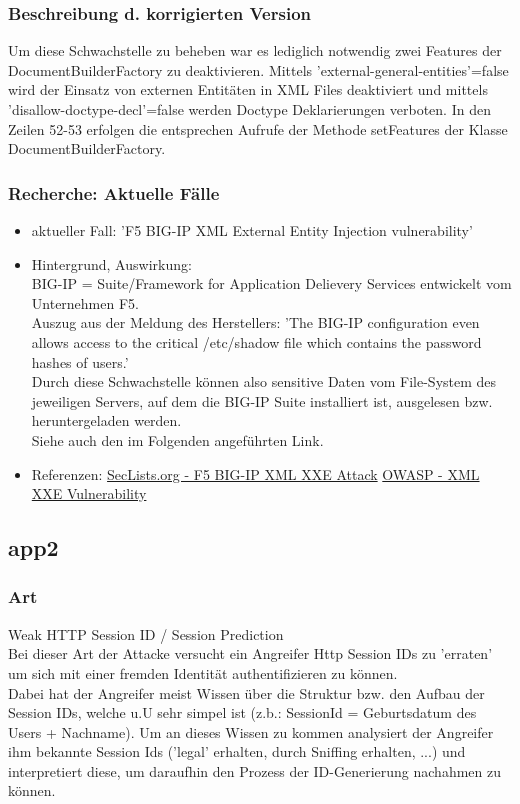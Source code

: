 \documentclass[12pt,a4paper,titlepage,oneside]{scrartcl}
\begin{document}
\subsubsection{Beschreibung d. korrigierten Version}
\noindent
Um diese Schwachstelle zu beheben war es lediglich notwendig zwei Features der DocumentBuilderFactory zu deaktivieren. Mittels 'external-general-entities'=false wird der Einsatz von externen Entitäten in XML Files deaktiviert und mittels 'disallow-doctype-decl'=false werden Doctype Deklarierungen verboten. 
In den Zeilen 52-53 erfolgen die entsprechen Aufrufe der Methode setFeatures der Klasse DocumentBuilderFactory.

\subsubsection{Recherche: Aktuelle Fälle}
\noindent	
\begin{itemize}
\item aktueller Fall: 'F5 BIG-IP XML External Entity Injection vulnerability'
\item Hintergrund, Auswirkung: \\
BIG-IP = Suite/Framework for Application Delievery Services entwickelt vom Unternehmen F5.\\
Auszug aus der Meldung des Herstellers: 'The BIG-IP configuration even allows access to the critical /etc/shadow file which contains the password hashes of users.' \\
Durch diese Schwachstelle können also sensitive Daten vom File-System des jeweiligen Servers, auf dem die BIG-IP Suite installiert ist, ausgelesen bzw. heruntergeladen werden. \\
Siehe auch den im Folgenden angeführten Link.
\item Referenzen: 
\subitem \href{ http://seclists.org/bugtraq/2013/Jan/92}{SecLists.org - F5 BIG-IP XML XXE Attack}
\subitem \href{https://www.owasp.org/index.php/XML_External_Entity_(XXE)_Processing}{OWASP - XML XXE Vulnerability}
\end{itemize}

\subsection{app2}
\noindent

\subsubsection{Art}
\noindent
Weak HTTP Session ID / Session Prediction \\
Bei dieser Art der Attacke versucht ein Angreifer Http Session IDs zu 'erraten' um sich mit einer fremden Identität authentifizieren zu können. \\
Dabei hat der Angreifer meist Wissen über die Struktur bzw. den Aufbau der Session IDs, welche u.U sehr simpel ist (z.b.: SessionId = Geburtsdatum des Users + Nachname).
Um an dieses Wissen zu kommen analysiert der Angreifer ihm bekannte Session Ids ('legal' erhalten, durch Sniffing erhalten, ...) und interpretiert diese, um daraufhin den Prozess der ID-Generierung nachahmen zu können.
\end{document}
